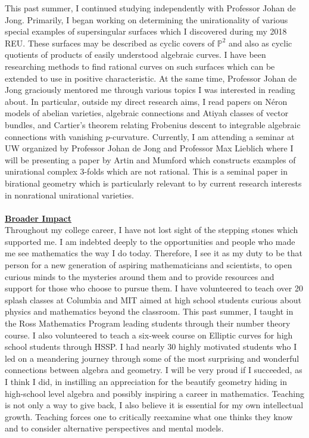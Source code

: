 \documentclass[11pt]{amsart}
\begin{document}
\par 
This past summer, I continued studying independently with Professor Johan de Jong. Primarily, I began working on determining the unirationality of various special examples of supersingular surfaces which I discovered during my 2018 REU. These surfaces may be described as cyclic covers of $\mathbb{P}^2$ and also as cyclic quotients of products of easily understood algebraic curves. I have been researching methods to find rational curves on such surfaces which can be extended to use in positive characteristic.
At the same time, Professor Johan de Jong graciously mentored me through various topics I was interested in reading about. In particular, outside my direct research aims, I read papers on N\'{e}ron models of abelian varieties, algebraic connections and Atiyah classes of vector bundles, and Cartier's theorem relating Frobenius descent to integrable algebraic connections with vanishing $p$-curvature. Currently, I am attending a seminar at UW organized by Professor Johan de Jong and Professor Max Lieblich where I will be presenting a paper by Artin and Mumford which constructs examples of unirational complex $3$-folds which are not rational. This is a seminal paper in birational geometry which is particularly relevant to by current research interests in nonrational unirational varieties.
\\
\\
\noindent
\underline{\textbf{Broader Impact}}
\\
Throughout my college career, I have not lost sight of the stepping stones which supported me. I am indebted deeply to the opportunities and people who made me see mathematics the way I do today. Therefore, I see it as my duty to be that person for a new generation of aspiring mathematicians and scientists, to open curious minds to the mysteries around them and to provide resources and support for those who choose to pursue them. 
I have volunteered to teach over 20 splash classes at Columbia and MIT aimed at high school students curious about physics and mathematics beyond the classroom.
This past summer, I taught in the Ross Mathematics Program leading students through their number theory course. I also volunteered to teach a six-week course on Elliptic curves for high school students through HSSP. I had nearly 30 highly motivated students who I led on a meandering journey through some of the most surprising and wonderful connections between algebra and geometry. I will be very proud if I succeeded, as I think I did, in instilling an appreciation for the beautify geometry hiding in high-school level algebra and possibly inspiring a career in mathematics. Teaching is not only a way to give back, I also believe it is essential for my own intellectual growth. Teaching forces one to critically reexamine what one thinks they know and to consider alternative perspectives and mental models. 
\end{document}
